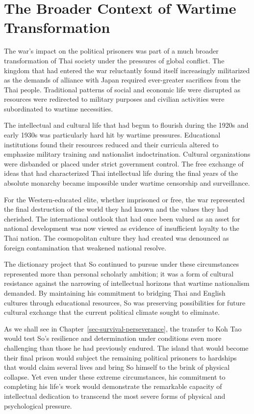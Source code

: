 \documentclass[
  Letterpaper,
]{scrbook}
\begin{document}
\section{The Broader Context of Wartime
Transformation}\label{the-broader-context-of-wartime-transformation}

The war's impact on the political prisoners was part of a much broader
transformation of Thai society under the pressures of global conflict.
The kingdom that had entered the war reluctantly found itself
increasingly militarized as the demands of alliance with Japan required
ever-greater sacrifices from the Thai people. Traditional patterns of
social and economic life were disrupted as resources were redirected to
military purposes and civilian activities were subordinated to wartime
necessities.

The intellectual and cultural life that had begun to flourish during the
1920s and early 1930s was particularly hard hit by wartime pressures.
Educational institutions found their resources reduced and their
curricula altered to emphasize military training and nationalist
indoctrination. Cultural organizations were disbanded or placed under
strict government control. The free exchange of ideas that had
characterized Thai intellectual life during the final years of the
absolute monarchy became impossible under wartime censorship and
surveillance.

For the Western-educated elite, whether imprisoned or free, the war
represented the final destruction of the world they had known and the
values they had cherished. The international outlook that had once been
valued as an asset for national development was now viewed as evidence
of insufficient loyalty to the Thai nation. The cosmopolitan culture
they had created was denounced as foreign contamination that weakened
national resolve.

The dictionary project that So continued to pursue under these
circumstances represented more than personal scholarly ambition; it was
a form of cultural resistance against the narrowing of intellectual
horizons that wartime nationalism demanded. By maintaining his
commitment to bridging Thai and English cultures through educational
resources, So was preserving possibilities for future cultural exchange
that the current political climate sought to eliminate.

As we shall see in Chapter~\ref{sec-survival-perseverance}, the transfer
to Koh Tao would test So's resilience and determination under conditions
even more challenging than those he had previously endured. The island
that would become their final prison would subject the remaining
political prisoners to hardships that would claim several lives and
bring So himself to the brink of physical collapse. Yet even under these
extreme circumstances, his commitment to completing his life's work
would demonstrate the remarkable capacity of intellectual dedication to
transcend the most severe forms of physical and psychological pressure.
\end{document}
